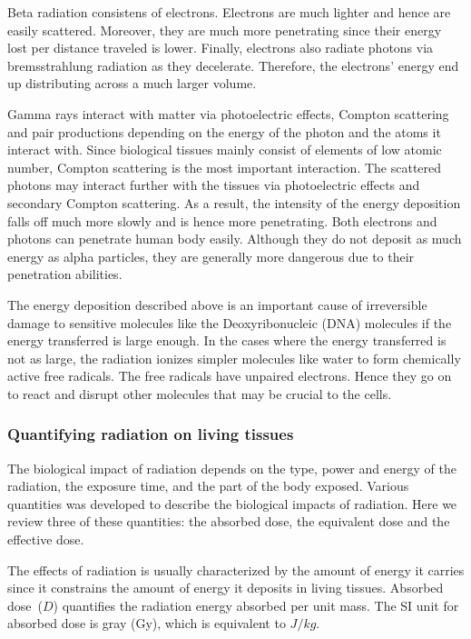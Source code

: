 \documentclass[nofootinbib,preprint,aps]{revtex4-1}
\begin{document}
        Beta radiation consistens of electrons. Electrons are much lighter and hence are easily scattered.
        Moreover, they are much more penetrating since their energy lost per distance traveled is lower.
        Finally, electrons also radiate photons
        via bremsstrahlung radiation as they decelerate. Therefore, the electrons' energy end up distributing
        across a much larger volume.

        Gamma rays interact with matter via photoelectric effects, Compton scattering and pair productions
        depending on the energy of the photon and the atoms it interact with.
        Since biological tissues mainly consist of elements of low atomic number, Compton
        scattering is the most important interaction. The scattered photons may interact further with the tissues
        via photoelectric effects and secondary Compton scattering. As a result, the intensity of the energy deposition falls
        off much more slowly and is hence more penetrating. Both electrons and photons can penetrate human body easily.
        Although they do not deposit as much energy as alpha particles, they are generally more dangerous due to their
        penetration abilities.

        The energy deposition described above is an important cause of irreversible damage to sensitive molecules
        like the Deoxyribonucleic (DNA) molecules if the energy transferred is large enough.
        In the cases where the energy transferred is not as large, the radiation ionizes simpler molecules like water
        to form chemically active free radicals. The free radicals have unpaired electrons. Hence they go on to react
        and disrupt
        other molecules that may be crucial to the cells.


        \subsubsection{Quantifying radiation on living tissues}
        The biological impact of radiation depends on the type, power and energy of the radiation, the
        exposure time, and the part of the body exposed. Various quantities was developed to
        describe the biological impacts of radiation. Here we review three
        of these quantities: the absorbed dose, the equivalent dose and the effective dose.

        The effects of radiation is usually characterized by the amount of energy it carries since it constrains
        the amount of energy it deposits in living tissues.
        Absorbed dose~($D$) quantifies the 
        radiation energy absorbed per unit mass. The SI unit for absorbed dose is gray (Gy), which is
        equivalent to $J/kg$.
\end{document}
